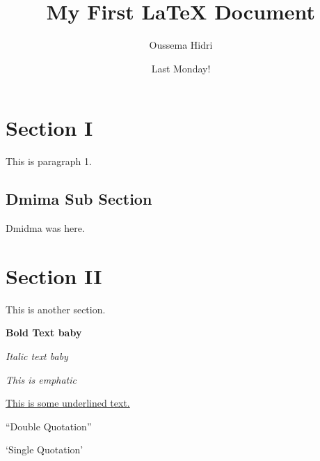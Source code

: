 \documentclass{article}
\author{Oussema Hidri}
\title{My First {\LaTeX} Document}
\date{Last Monday!}
\begin{document}
\maketitle

\section{Section I}

This is paragraph 1.

\subsection{Dmima Sub Section}

Dmidma was here.

\section{Section II}

This is another section.

\textbf{Bold Text baby}

\textit{Italic text baby}

\emph{This is emphatic}

\underline{This is some underlined text.}


``Double Quotation''


`Single Quotation'
\end{document}
